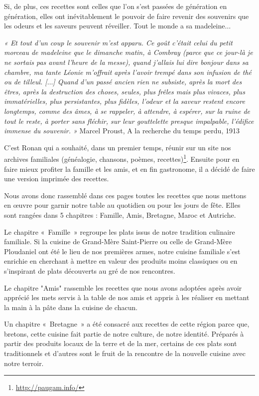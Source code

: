 Si, de plus, ces recettes sont celles que l’on s’est passées de génération en génération, elles ont inévitablement le pouvoir de faire revenir des souvenirs que les odeurs et les saveurs peuvent réveiller. Tout le monde a sa madeleine$\ldots$

\textit{« Et tout d'un coup le souvenir m'est apparu. Ce goût c'était celui du petit morceau de madeleine que le dimanche matin, à Combray (parce que ce jour-là je ne sortais pas avant l'heure de la messe), quand j'allais lui dire bonjour dans sa chambre, ma tante Léonie m'offrait après l'avoir trempé dans son infusion de thé ou de tilleul. [$\ldots$] Quand d'un passé ancien rien ne subsiste, après la mort des êtres, après la destruction des choses, seules, plus frêles mais plus vivaces, plus immatérielles, plus persistantes, plus fidèles, l'odeur et la saveur restent encore longtemps, comme des âmes, à se rappeler, à attendre, à espérer, sur la ruine de tout le reste, à porter sans fléchir, sur leur gouttelette presque impalpable, l'édifice immense du souvenir. »} Marcel Proust, A la recherche du temps perdu, 1913

C’est Ronan qui a souhaité, dans un premier temps, réunir sur un site nos archives familiales (généalogie, chansons, poèmes, recettes)\footnote{\url{http://paugam.info/}}. Ensuite pour en faire mieux profiter la famille et les amis, et en fin gastronome, il a décidé de faire une version imprimée des recettes.

Nous avons donc rassemblé dans ces pages toutes les recettes que nous mettons en œuvre pour garnir notre table au quotidien ou pour les jours de fête. Elles sont rangées dans 5 chapitres : Famille, Amis, Bretagne, Maroc et Autriche.

Le chapitre « Famille » regroupe les plats issus de notre tradition culinaire familiale. Si la cuisine de Grand-Mère Saint-Pierre ou celle de Grand-Mère Ploudaniel ont été le lieu de nos premières armes, notre cuisine familiale s’est enrichie en cherchant à mettre en valeur des produits moins classiques ou en s'inspirant de plats découverts au gré de nos rencontres.

Le chapitre "Amis" rassemble les recettes que nous avons adoptées après avoir apprécié les mets servis à la table de nos amis et appris à les réaliser en mettant la main à la pâte dans la cuisine de chacun.

Un chapitre « Bretagne » a été consacré aux recettes de cette région parce que, bretons, cette cuisine fait partie de notre culture, de notre identité. Préparés à partir des produits locaux de la terre et de la mer, certains de ces plats sont traditionnels et d’autres sont le fruit de la rencontre de la nouvelle cuisine avec notre terroir.

